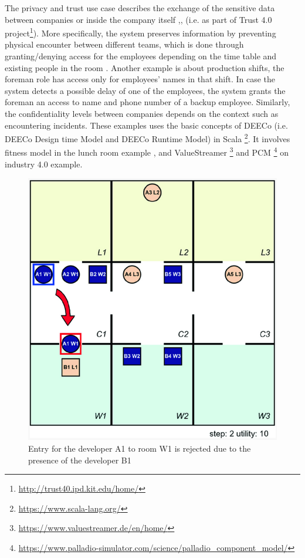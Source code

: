  The privacy and trust use case describes the exchange of the sensitive data between companies or inside the company itself \cite{Al-Ali:2018:MDT:3241403.3241450},\cite{10.1007/978-3-030-03424-5_12},\cite{alali2018usecases} (i.e. as part of Trust 4.0 project\footnote{\url{http://trust40.ipd.kit.edu/home/}}). More specifically, the system preserves information by preventing physical encounter between different teams, which is done through granting/denying access for the employees depending on the time table and existing people in the room \cite{10.1007/978-3-030-03424-5_12}. Another example is about production shifts, the foreman role has access only for employees' names in that shift. In case the system detects a possible delay of one of the employees, the system grants the foreman an access to name and phone number of a backup employee. Similarly, the confidentiality levels between companies depends on the context such as encountering incidents. These examples uses the basic concepts of DEECo (i.e. DEECo Design time Model and DEECo Runtime Model) in Scala \footnote{\url{https://www.scala-lang.org/}}. It involves fitness model in the lunch room example \cite{10.1007/978-3-030-03424-5_12}, and ValueStreamer \footnote{\url{https://www.valuestreamer.de/en/home/}} and PCM \footnote{\url{https://www.palladio-simulator.com/science/palladio_component_model/}} on industry 4.0 example.   
 
\begin{figure}[!htb]
\centering
\includegraphics[scale=0.44]{figures/lunchroom}
\caption{Entry for the developer A1 to room W1 is rejected due to the presence of the developer B1}
\label{fig:lunchroom}
\end{figure}

